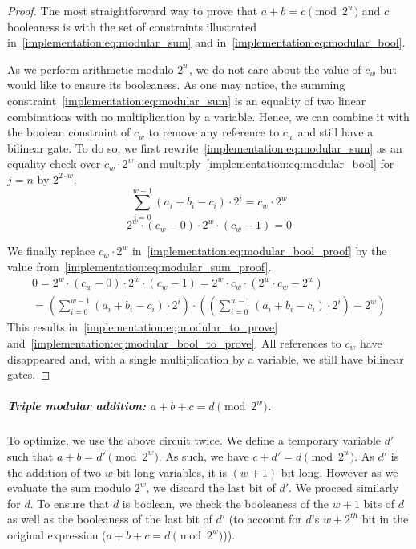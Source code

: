 \begin{proof}
The most straightforward way to prove that $a+b=c \pmod{2^w}$ and $c$ booleaness is with the set of constraints illustrated in~\cref{implementation:eq:modular_sum} and in~\cref{implementation:eq:modular_bool}.

As we perform arithmetic modulo $2^w$, we do not care about the value of $c_w$ but would like to ensure its booleaness. As one may notice, the summing constraint~\cref{implementation:eq:modular_sum} is an equality of two linear combinations with no multiplication by a variable. Hence, we can combine it with the boolean constraint of $c_w$ to remove any reference to $c_w$ and still have a bilinear gate. To do so, we first rewrite~\cref{implementation:eq:modular_sum} as an equality check over $c_{w}\cdot 2^{w}$ and multiply~\cref{implementation:eq:modular_bool} for $j=n$ by $2^{2\cdot w}$.
\begin{equation}
  \label{implementation:eq:modular_sum_proof}
  \sum_{i=0}^{w - 1} (a_i + b_i - c_i) \cdot 2^i = c_{w} \cdot 2^w
\end{equation}
\begin{equation}
  \label{implementation:eq:modular_bool_proof}
  2^w \cdot (c_w - 0) \cdot 2^w \cdot (c_w - 1)= 0
\end{equation}

We finally replace $c_w \cdot 2^w$ in~\cref{implementation:eq:modular_bool_proof} by the value from~\cref{implementation:eq:modular_sum_proof}.
\begin{multline*}
  0 = 2^w \cdot (c_w - 0) \cdot 2^w \cdot (c_w - 1) = 2^w \cdot c_w \cdot (2^w \cdot c_w - 2^w)\\
  = \left ( \sum_{i=0}^{w - 1} ( a_i + b_i - c_i ) \cdot 2^i \right ) \cdot \left( \left (\sum_{i=0}^{w - 1} ( a_i + b_i - c_i ) \cdot 2^i \right ) - 2^w \right)
\end{multline*}
This results in~\cref{implementation:eq:modular_to_prove} and~\cref{implementation:eq:modular_bool_to_prove}. All references to $c_w$ have disappeared and, with a single multiplication by a variable, we still have bilinear gates.\end{proof}

\subparagraph{Triple modular addition: {\boldmath $a + b + c = d \pmod {2^w}$}.}

To optimize, we use the above circuit twice. We define a temporary variable $d'$ such that $a+b = d' \pmod {2^w}$. As such, we have $c+d'= d \pmod {2^w}$. As $d'$ is the addition of two $w$-bit long variables, it is $(w + 1)$-bit long. However as we evaluate the sum modulo $2^w$, we discard the last bit of $d'$. We proceed similarly for $d$.
To ensure that $d$ is boolean, we check the booleaness of the $w+1$ bits of $d$ as well as the booleaness of the last bit of $d'$ (to account for $d$'s ${w+2}^{th}$ bit in the original expression ($a + b + c = d \pmod {2^w}$)).

